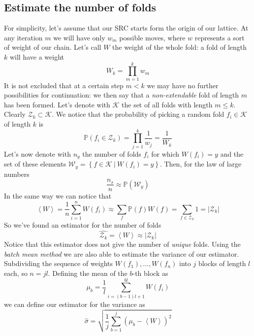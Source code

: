 \subsection{Estimate the number of folds}
For simplicity, let's assume that our SRC starts form the origin of our lattice.
At any iteration $m$ we will have only $w_m$ possible moves, where $w$ represents a sort of weight of our chain.
Let's call $W$ the weight of the whole fold: a fold of length $k$ will have a weight
\begin{equation*}
    W_k = \prod_{m=1}^k w_m
\end{equation*}
It is not excluded that at a certain step $m < k$ we may have no further possibilities for continuation: we then say that a \emph{non-extendable} fold of length $m$ has been formed.
Let's denote with $\mathcal{K}$ the set of all folds with length $m \leq k$.
Clearly $\mathcal{Z}_k \subset \mathcal{K}$.
We notice that the probability of picking a random fold $f_i \in \mathcal{K}$ of length $k$ is
\begin{equation*}
    \mathbb{P}\left(f_i \in \mathcal{Z}_k\right) = \prod_{j=1}^k \frac{1}{w_j} = \frac{1}{W_k}
\end{equation*}
Let's now denote with $n_y$ the number of folds $f_i$ for which $W\left(f_i\right) = y$ and the set of these elements $\mathcal{W}_y = \left\{f \in \mathcal{K} \ | \ W\left(f_i\right) = y\right\}$.
Then, for the law of large numbers
\begin{equation*}
    \frac{n_s}{n} \approx \mathbb{P}\left(\mathcal{W}_y\right)
\end{equation*}
In the same way we can notice that
\begin{equation*}
    \left\langle W \right\rangle = \frac{1}{n} \sum_{i=1}^n W\left(f_i\right) \approx \sum_f \mathbb{P}\left(f\right)W\left(f\right) = \sum_{f \in \mathcal{Z}_k} 1 = \left\lvert \mathcal{Z}_k \right\rvert
\end{equation*}
So we've found an estimator for the number of folds
\begin{equation}
    \hat{\mathcal{Z}_k} = \left\langle W \right\rangle \approx \left\lvert \mathcal{Z}_k \right\rvert
\end{equation}
Notice that this estimator does not give the number of \emph{unique} folds.
Using the \emph{batch mean method} we are also able to estimate the variance of our estimator.
Subdividing the sequence of weights $W\left(f_1\right),\ldots,W\left(f_n\right)$ into $j$ blocks of length $l$ each, so $n = jl$.
Defining the mean of the $b$-th block as
\begin{equation*}
    \mu_b = \frac{1}{l} \sum_{i = (b-1)l + 1}^{bl} W\left(f_i\right)
\end{equation*}
we can define our estimator for the variance as
\begin{equation}
    \hat{\sigma} = \sqrt{\frac{1}{j} \sum_{b = 1}^j \left(\mu_b - \left\langle W \right\rangle\right)^2}
\end{equation}